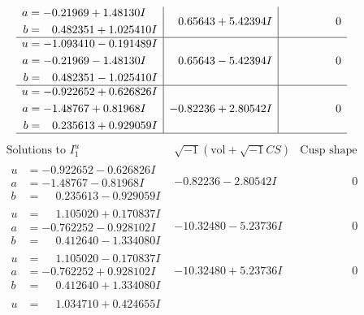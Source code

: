 \documentclass[1p]{elsarticle_modified}
\theoremstyle{definition}
\newcommand{\I}{\sqrt{-1}}
\begin{document}
$$\begin{array}{c|c|c}
\begin{aligned}
a &= -0.21969 + 1.48130 I \\
b &= \phantom{-}0.482351 + 1.025410 I\end{aligned}
 & \phantom{-}0.65643 + 5.42394 I & \phantom{-0.000000 } 0 \\ \hline\begin{aligned}
u &= -1.093410 - 0.191489 I \\
a &= -0.21969 - 1.48130 I \\
b &= \phantom{-}0.482351 - 1.025410 I\end{aligned}
 & \phantom{-}0.65643 - 5.42394 I & \phantom{-0.000000 } 0 \\ \hline\begin{aligned}
u &= -0.922652 + 0.626826 I \\
a &= -1.48767 + 0.81968 I \\
b &= \phantom{-}0.235613 + 0.929059 I\end{aligned}
 & -0.82236 + 2.80542 I & \phantom{-0.000000 } 0\\
 \hline 
 \end{array}$$\newpage$$\begin{array}{c|c|c}  
\text{Solutions to }I^u_{1}& \I (\text{vol} + \sqrt{-1}CS) & \text{Cusp shape}\\
 \hline 
\begin{aligned}
u &= -0.922652 - 0.626826 I \\
a &= -1.48767 - 0.81968 I \\
b &= \phantom{-}0.235613 - 0.929059 I\end{aligned}
 & -0.82236 - 2.80542 I & \phantom{-0.000000 } 0 \\ \hline\begin{aligned}
u &= \phantom{-}1.105020 + 0.170837 I \\
a &= -0.762252 - 0.928102 I \\
b &= \phantom{-}0.412640 - 1.334080 I\end{aligned}
 & -10.32480 - 5.23736 I & \phantom{-0.000000 } 0 \\ \hline\begin{aligned}
u &= \phantom{-}1.105020 - 0.170837 I \\
a &= -0.762252 + 0.928102 I \\
b &= \phantom{-}0.412640 + 1.334080 I\end{aligned}
 & -10.32480 + 5.23736 I & \phantom{-0.000000 } 0 \\ \hline\begin{aligned}
u &= \phantom{-}1.034710 + 0.424655 I \\

\end{aligned}
\end{array}$$
\end{document}
